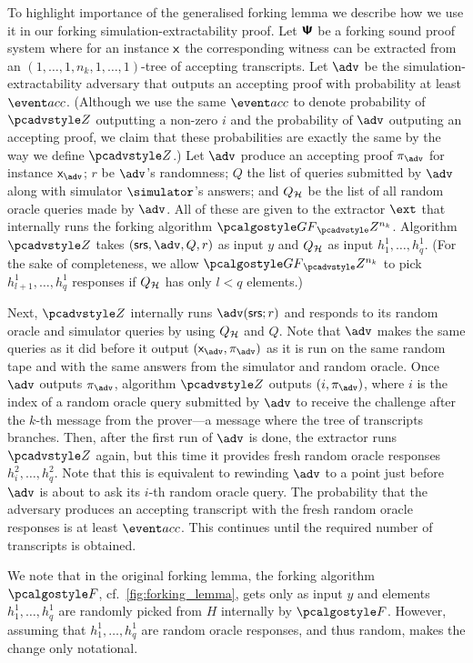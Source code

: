 \documentclass[runningheads,11pt]{llncs}
\begin{document}
To highlight importance of the generalised forking lemma we describe how we use
it in our forking simulation-extractability proof.  Let $\bm{\mathsf{\Psi}}$ be a
forking sound proof system where for an instance $\mathsf{x}$ the
corresponding witness can be extracted from an
$(1, \ldots, 1, n_k, 1, \ldots, 1)$-tree of accepting transcripts.  Let $\advse$
be the simulation-extractability adversary that outputs an accepting proof with
probability at least $\accProb$. (Although we use the same $\accProb$ to denote
probability of $\zdv$ outputting a non-zero $i$ and the probability of $\advse$
outputing an accepting proof, we claim that these probabilities are exactly the
same by the way we define $\zdv$.)  Let $\advse$ produce an accepting
proof $\zkproof_{\advse}$ for instance $\inp_{\advse}$; $r$ be $\advse$'s
randomness; $Q$ the list of queries submitted by $\advse$ along with simulator
$\simulator$'s answers; and $Q_{\mathcal{H}}$ be the list of all random oracle
queries made by $\advse$.  All of these are given to the extractor $\ext$ that
internally runs the forking algorithm $\genforking_\zdv^{n_k}$.  Algorithm $\zdv$
takes $(\srs, \advse,
Q, r)$ as input $y$ and $Q_{\mathcal{H}}$ as input $h_1^1, \ldots,
h_q^1$. 
(For the sake of completeness, we allow $\genforking_\zdv^{n_k}$ to
pick $h^1_{l + 1}, \ldots, h^1_q$ responses if $Q_{\mathcal{H}}$ has only $l < q$
elements.)  

Next, $\zdv$ internally runs $\advse(\srs; r)$ and responds to its random
oracle and simulator queries by using $Q_{\mathcal{H}}$ and $Q$. Note that $\advse$ makes
the same queries as it did before it output $(\inp_{\advse}, \zkproof_{\advse})$
as it is run on the same random tape and with the same answers from the
simulator and random oracle. Once $\advse$ outputs 
$\zkproof_{\advse}$, algorithm $\zdv$ outputs $(i, \zkproof_{\advse})$, where
$i$ is the index of a random oracle query submitted by $\advse$ to receive the challenge after the
$k$-th message from the prover---a message where the tree of transcripts
branches.
Then, after the first run of $\advse$ is done, the extractor runs $\zdv$ again,
but this time it provides fresh random oracle responses $h^2_i, \ldots,
h^2_q$. Note that this is equivalent to rewinding $\advse$ to a point just
before $\advse$ is about to ask its $i$-th random oracle
query. The probability that the adversary produces an accepting transcript with the
fresh random oracle responses is at least $\accProb$. This continues until the
required number of transcripts is obtained. 

We note that in the original forking lemma, the forking algorithm $\forking$,
cf.~\cref{fig:forking_lemma}, gets only as input $y$ and elements $h^1_1, \ldots,
h^1_q$ are randomly picked from $H$ internally by $\forking$. However, assuming
that $h^1_1, \ldots, h^1_q$ are random oracle responses, and thus random, makes
the change only notational.
\end{document}
